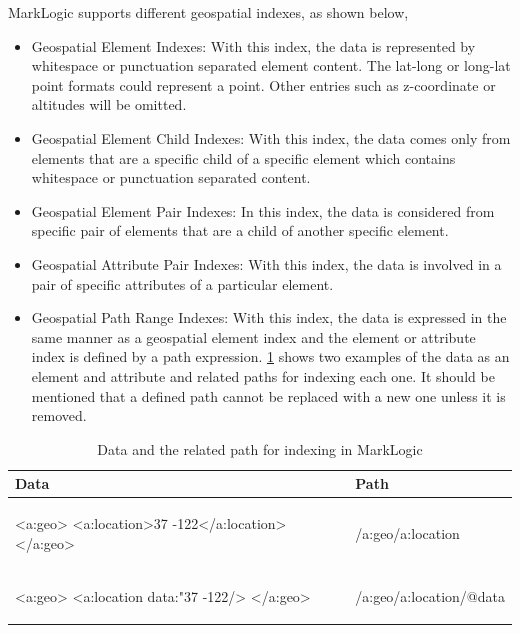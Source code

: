 \documentclass[a4paper,12pt]{article}
\begin{document}
MarkLogic supports different geospatial indexes, as shown below,
\begin{itemize}
\item Geospatial Element Indexes: With this index, the data is represented by whitespace or punctuation separated element content. The lat-long or long-lat point formats could represent a point. Other entries such as z-coordinate or altitudes will be omitted.
\item Geospatial Element Child Indexes: With this index, the data comes only from elements that are a specific child of a specific element which contains whitespace or punctuation separated content.
\item Geospatial Element Pair Indexes: In this index, the data is considered from specific pair of elements that are a child of another specific element.
\item Geospatial Attribute Pair Indexes: With this index, the data is involved in a pair of specific attributes of a particular element.
\item Geospatial Path Range Indexes: With this index, the data is expressed in the same manner as a geospatial element index and the element or attribute index is defined by a path expression. \ref{t.pathindexmarklogic} shows two examples of the data as an element and attribute and related paths for indexing each one. It should be mentioned that a defined path cannot be replaced with a new one unless it is removed.
\end{itemize}
\vspace{10px}
\begin{table}
\centering
\begin{tabular}{|l |l |}\hline
\textbf{Data} & \textbf{Path}\\\hline
\begin{fakeJSON}
<a:geo>
  <a:location>37 -122</a:location>
</a:geo>
\end{fakeJSON} &
\begin{fakeJSON}
/a:geo/a:location
\end{fakeJSON}\\\hline
\begin{fakeJSON}
<a:geo>
  <a:location data:"37 -122/>
</a:geo>
\end{fakeJSON} &
\begin{fakeJSON}
/a:geo/a:location/@data
\end{fakeJSON}
\\\hline
\end{tabular}
\caption{Data and the related path for indexing in MarkLogic}
\label{t.pathindexmarklogic}
\end{table}
\vspace{10px}
\end{document}
